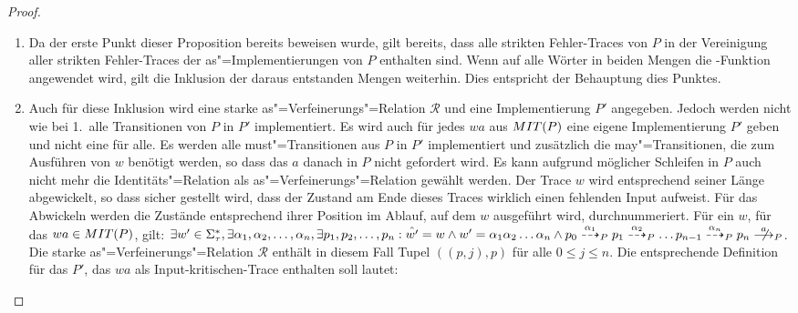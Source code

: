 \begin{proof}
\begin{enumerate}
    \item Da der erste Punkt dieser Proposition bereits beweisen wurde, gilt
      bereits, dass alle strikten Fehler-Traces von $P$ in der Vereinigung
      aller strikten Fehler-Traces der as"=Implementierungen von $P$ enthalten
      sind. Wenn auf alle Wörter in beiden Mengen die \prune{}-Funktion
      angewendet wird, gilt die Inklusion der daraus entstanden Mengen
      weiterhin. Dies entspricht der Behauptung dies Punktes.
    \item Auch für diese Inklusion wird eine starke as"=Verfeinerungs"=Relation
      $\mathcal{R}$ und eine Implementierung $P'$ angegeben. Jedoch werden
      nicht wie bei 1.\ alle Transitionen von $P$ in $P'$ implementiert. Es
      wird auch für jedes $wa$ aus $MIT (P)$ eine eigene Implementierung $P'$
      geben und nicht eine für alle. Es werden alle must"=Transitionen aus $P$
      in $P'$ implementiert und zusätzlich die may"=Transitionen, die zum
      Ausführen von $w$ benötigt werden, so dass das $a$ danach in $P$ nicht
      gefordert wird. Es kann aufgrund möglicher Schleifen in $P$ auch nicht
      mehr die Identitäts"=Relation als as"=Verfeinerungs"=Relation gewählt
      werden. Der Trace $w$ wird entsprechend seiner Länge abgewickelt, so dass
      sicher gestellt wird, dass der Zustand am Ende dieses Traces wirklich
      einen fehlenden Input aufweist. Für das Abwickeln werden die Zustände
      entsprechend ihrer Position im Ablauf, auf dem $w$ ausgeführt wird,
      durchnummeriert. Für ein $w$, für das $wa\in MIT (P)$, gilt: $\exists
      w'\in\Sigma _{\tau} ^*, \exists \alpha _1,\alpha _2,\dots ,\alpha _n,
      \exists p_1,p_2,\dots ,p_n: \hat{w'} = w\land w'=\alpha _1\alpha _2\dots
      \alpha _n\land p_0 \may[\alpha _1]_P p_1 \may[\alpha _2]_P \dots
      p_{n-1}\may[\alpha _n]_P p_n \nmust[a]_P$.
      Die starke as"=Verfeinerungs"=Relation $\mathcal{R}$ enthält in diesem
      Fall Tupel $((p,j),p)$ für alle $0\leq j \leq n$. Die entsprechende
      Definition für das $P'$, das $wa$ als Input-kritischen-Trace enthalten
      soll lautet:
\end{enumerate}
\end{proof}

